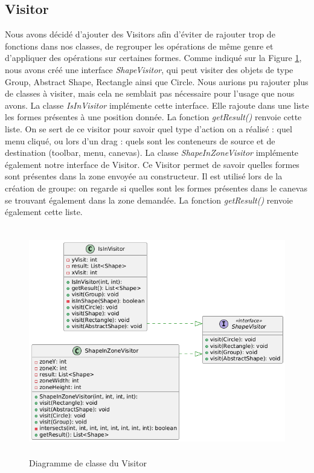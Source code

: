 \documentclass{article}
\begin{document}
\subsection{Visitor}
Nous avons décidé d'ajouter des Visitors afin d'éviter de rajouter trop de fonctions dans nos classes,
de regrouper les opérations de même genre et d'appliquer des opérations sur certaines formes.
Comme indiqué sur la Figure \ref{Visitor}, nous avons créé une interface \textit{ShapeVisitor}, qui
peut visiter des objets de type Group, Abstract Shape, Rectangle ainsi que Circle. Nous aurions pu rajouter plus de classes à
visiter, mais cela ne semblait pas nécessaire pour l'usage que nous avons.
La classe \textit{IsInVisitor} implémente cette interface. Elle rajoute dans une liste les formes présentes à une position donnée.
La fonction \textit{getResult()} renvoie cette liste.
On se sert de ce visitor pour savoir quel type d'action on a réalisé : quel menu cliqué, ou lors d'un drag : quels sont les
conteneurs de source et de destination (toolbar, menu, canevas).
La classe \textit{ShapeInZoneVisitor} implémente également notre interface de Visitor.
Ce Visitor permet de savoir quelles formes sont présentes dans la zone envoyée au constructeur. Il est utilisé lors de la création de groupe:
on regarde si quelles sont les formes présentes dans le canevas se trouvant également dans la zone demandée.
La fonction \textit{getResult()} renvoie également cette liste.
\begin{figure}[h]
    \centering
    \includegraphics[width=\textwidth,height=10.0cm,keepaspectratio]{visitor.png}
    \caption{Diagramme de classe du Visitor}
    \label{Visitor}
\end{figure}
\FloatBarrier
\end{document}
